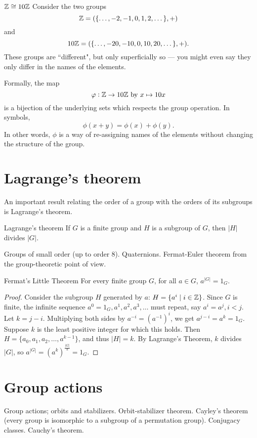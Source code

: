 \begin{exmp}{$\mathbb Z\cong10\mathbb Z$}{}
Consider the two groups
\[ \mathbb Z = (\{\dots, -2, -1, 0, 1, 2, \dots\}, +) \] and
\[ 10\mathbb Z = (\{\dots, -20, -10, 0, 10, 20, \dots\}, +). \]
These groups are ``different", but only superficially so --- you might even say they only differ in the names of the elements.

Formally, the map
\[ \varphi: \mathbb Z \to 10\mathbb Z \text{ by } x \mapsto 10x \]
is a bijection of the underlying sets which respects the group operation. In symbols,
\[ \phi(x+y) = \phi(x) + \phi(y). \]
In other words, $\phi$ is a way of re-assigning names of the elements without changing the structure of the group.
\end{exmp}
\pagebreak

\section{Lagrange's theorem}
An important result relating the order of a group with the orders of its subgroups is Lagrange's theorem.

\begin{thrm}{Lagrange's theorem}{}
If $G$ is a finite group and $H$ is a subgroup of $G$, then $|H|$ divides $|G|$.
\end{thrm}

Groups of small order (up to order 8). Quaternions. Fermat-Euler theorem
from the group-theoretic point of view.

\begin{thrm}{Fermat's Little Theorem}{}
For every finite group $G$, for all $a \in G$, $a^{|G|} = 1_G$.
\end{thrm}
\begin{proof}
Consider the subgroup $H$ generated by $a$: $H = \{a^i \mid i \in \mathbb Z\}$. Since $G$ is finite, the infinite sequence $a^0 = 1_G, a^1, a^2, a^3, \dots$ must repeat, say $a^i = a^j, i < j$. Let $k=j-i$. Multiplying both sides by $a^{-i} = (a^{-1})^i$, we get $a^{j-i} = a^k = 1_G$. Suppose $k$ is the least positive integer for which this holds. Then $H = \{a_0, a_1, a_2, \dots, a^{k-1}\}$, and thus $|H| = k$. By Lagrange’s Theorem, $k$ divides $|G|$, so $a^{|G|} = (a^k)^\frac{|G|}{k} = 1_G$.
\end{proof}

\section{Group actions}
Group actions; orbits and stabilizers. Orbit-stabilizer theorem. Cayley’s theorem (every group is isomorphic to a subgroup of a permutation group). Conjugacy classes. Cauchy’s theorem.

